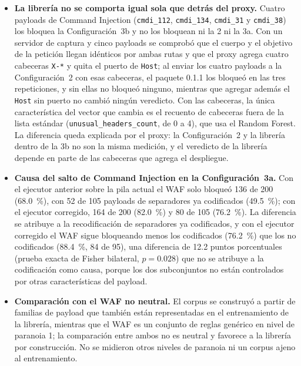 \begin{itemize}
    La atribución al WAF coincide, categoría por categoría, con lo medido por separado en la 3a,
    pero no es un cruce determinista.
    \item \textbf{La librería no se comporta igual sola que detrás del proxy.} Cuatro payloads de
    Command Injection (\texttt{cmdi\_112}, \texttt{cmdi\_134}, \texttt{cmdi\_31} y
    \texttt{cmdi\_38}) los bloquea la Configuración~3b y no los bloquean ni la 2 ni la 3a. Con
    un servidor de captura y cinco payloads se comprobó que el cuerpo y el objetivo de la petición
    llegan idénticos por ambas rutas y que el proxy agrega cuatro cabeceras \texttt{X-*} y quita el
    puerto de \texttt{Host}; al
    enviar los cuatro payloads a la Configuración~2 con esas cabeceras, el paquete 0.1.1 los
    bloqueó en las tres repeticiones, y sin ellas no bloqueó ninguno, mientras que agregar además
    el \texttt{Host} sin puerto no cambió ningún veredicto. Con las cabeceras, la única
    característica del vector que cambia es el recuento de cabeceras fuera de la lista estándar
    (\texttt{unusual\_headers\_count}, de 0 a 4), que usa el Random Forest. La diferencia queda
    explicada por el proxy: la Configuración~2 y la librería dentro de la 3b no son la misma
    medición, y el veredicto de la librería depende en parte de las cabeceras que agrega el
    despliegue.
    \item \textbf{Causa del salto de Command Injection en la Configuración~3a.} Con el ejecutor
    anterior sobre la pila actual el WAF solo bloqueó 136 de 200 (68.0~\%), con 52 de 105 payloads
    de separadores ya codificados (49.5~\%); con el ejecutor corregido, 164 de 200 (82.0~\%) y 80 de
    105 (76.2~\%). La diferencia se atribuye a la recodificación de separadores ya codificados, y
    con el ejecutor corregido el WAF sigue bloqueando menos los codificados (76.2~\%) que los
    no codificados (88.4~\%, 84 de 95), una diferencia de 12.2 puntos porcentuales (prueba exacta de
    Fisher bilateral, $p = 0.028$) que no se atribuye a la codificación como causa, porque los dos
    subconjuntos no están controlados por otras características del payload.
        \item \textbf{Comparación con el WAF no neutral.} El corpus se construyó a partir de familias
    de payload que también están representadas en el entrenamiento de la librería, mientras que el
    WAF es un conjunto de reglas genérico en nivel de paranoia 1; la comparación entre ambos no es
    neutral y favorece a la librería por construcción. No se midieron otros niveles de paranoia ni
    un corpus ajeno al entrenamiento.

\end{itemize}
